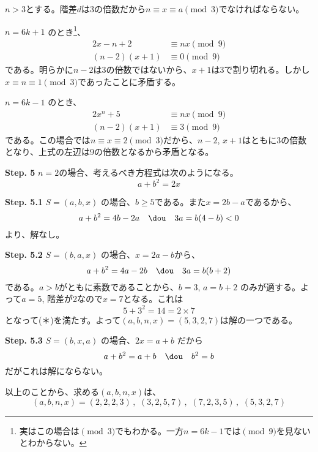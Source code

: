 $n>3$とする。階差$d$は3の倍数だから$n\equiv x\equiv a \pmod{3}$でなければならない。

$n=6k+1$ のとき\footnote{実はこの場合は$\pmod{3}$でもわかる。一方$n=6k-1$では$\pmod{9}$を見ないとわからない。}、
\begin{align*}
 2x-n+2&\equiv nx \pmod{9} \\
 (n-2)(x+1)&\equiv 0\pmod{9}
\end{align*}
である。明らかに$n-2$は3の倍数ではないから、$x+1$は3で割り切れる。しかし$x\equiv n\equiv 1\pmod{3}$であったことに矛盾する。

$n=6k-1$ のとき、
\begin{align*}
 2x^n+5&\equiv nx\pmod{9} \\
 (n-2)(x+1)&\equiv 3 \pmod{9}
\end{align*}
である。この場合では$n\equiv x\equiv 2 \pmod{3}$だから、$n-2$, $x+1$はともに3の倍数となり、上式の左辺は9の倍数となるから矛盾となる。

{\bf \large Step. 5} $n=2$の場合、考えるべき方程式は次のようになる。
\[ a+b^2=2x \]

{\bf \large Step. 5.1} $S=(a,b,x)$ の場合、$b\ge 5$である。また$x=2b-a$であるから、
\[ a+b^2=4b-2a \quad\dou\quad 3a=b(4-b) < 0 \]
より、解なし。

{\bf \large Step. 5.2} $S=(b,a,x)$ の場合、$x=2a-b$から、
\[ a+b^2=4a-2b \quad\dou\quad 3a=b(b+2) \]
である。$a>b$がともに素数であることから、$b=3$, $a=b+2$ のみが適する。よって$a=5$, 階差が2なので$x=7$となる。これは
\[ 5+3^2=14=2\times 7 \]
となって(＊)を満たす。よって$(a,b,n,x)=(5,3,2,7)$は解の一つである。

{\bf \large Step. 5.3} $S=(b,x,a)$ の場合、$2x=a+b$ だから
\[ a+b^2=a+b \quad\dou\quad b^2=b \]
だがこれは解にならない。

\vspace{1zw}

以上のことから、求める$(a,b,n,x)$は、
\[ (a,b,n,x)=(2,2,2,3) \,,\,\, (3,2,5,7) \,,\,\, (7,2,3,5) \,,\,\, (5,3,2,7) \]